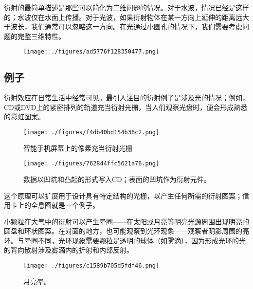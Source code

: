 衍射的最简单描述是那些可以简化为二维问题的情况。对于水波，情况已经是这样的；水波仅在水面上传播。对于光波，如果衍射物体在某一方向上延伸的距离远大于波长，我们通常可以忽略这一方向。在光通过小圆孔的情况下，我们需要考虑问题的完整三维特性。
\begin{figure}[ht]
\centering
\texttt{[image: ./figures/ad5776f128350477.png]}
\caption{} \label{fig_YS_6}
\end{figure}
\subsection{例子}
衍射效应在日常生活中经常可见。最引人注目的衍射例子是涉及光的情况；例如，CD或DVD上的紧密排列的轨道充当衍射光栅，当人们观察光盘时，便会形成熟悉的彩虹图案。
\begin{figure}[ht]
\centering
\texttt{[image: ./figures/f4db40bd154b36c2.png]}
\caption{智能手机屏幕上的像素充当衍射光栅} \label{fig_YS_7}
\end{figure}
\begin{figure}[ht]
\centering
\texttt{[image: ./figures/762844ffc5621a76.png]}
\caption{数据以凹坑和凸起的形式写入CD；表面的凹坑作为衍射元件。} \label{fig_YS_8}
\end{figure}
这个原理可以扩展用于设计具有特定结构的光栅，以产生任何所需的衍射图案；信用卡上的全息图就是一个例子。

小颗粒在大气中的衍射可以产生晕圈——在太阳或月亮等明亮光源周围出现明亮的圆盘和环状图案。在对面的地方，也可能观察到光环现象——观察者阴影周围的亮环。与晕圈不同，光环现象需要颗粒是透明的球体（如雾滴），因为形成光环的光的背向散射涉及雾滴内的折射和内部反射。
\begin{figure}[ht]
\centering
\texttt{[image: ./figures/c1589b705d5fdf46.png]}
\caption{月亮晕。} \label{fig_YS_9}
\end{figure}
